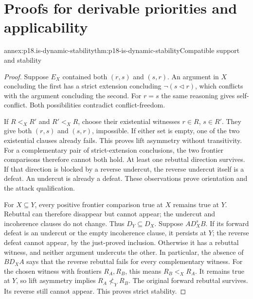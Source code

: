 \chapter{Proofs for derivable priorities and applicability}
\label{annex:p18-is-dynamic}

\begin{annexitem}{annex:p18.is-dynamic-stability}{thm:p18-is-dynamic-stability}{Compatible support and stability}
\begin{proof}
Suppose \(E_X\) contained both \((r,s)\) and \((s,r)\).
An argument in \(X\) concluding the first has a strict extension
concluding \(\neg(s\triangleleft r)\), which conflicts with the
argument concluding the second. For \(r=s\) the same reasoning
gives self-conflict. Both possibilities contradict conflict-freedom.

If \(R<_XR'\) and \(R'<_XR\), choose their existential witnesses
\(r\in R\), \(s\in R'\). They give both \((r,s)\) and \((s,r)\),
impossible. If either set is empty, one of the two existential
clauses already fails. This proves lift asymmetry without
transitivity. For a complementary pair of strict-extension
conclusions, the two frontier comparisons therefore cannot both
hold. At least one rebuttal direction survives. If that direction
is blocked by a reverse undercut, the reverse undercut itself is
a defeat. An undercut is already a defeat. These observations prove
orientation and the attack qualification.

For \(X\subseteq Y\), every positive frontier comparison true at
\(X\) remains true at \(Y\). Rebuttal can therefore disappear but
cannot appear; the undercut and incoherence clauses do not change.
Thus \(D_Y\subseteq D_X\).
Suppose \(A D_X^s B\). If its forward defeat is an undercut or
the empty incoherence clause, it persists at \(Y\); the reverse
defeat cannot appear, by the just-proved inclusion.
Otherwise it has a rebuttal witness, and neither argument undercuts
the other. In particular, the absence of \(B D_XA\) says that
the reverse rebuttal fails for every complementary witness.
For the chosen witness with frontiers \(R_A,R_B\), this means
\(R_B<_XR_A\). It remains true at \(Y\), so lift asymmetry implies
\(R_A\not<_YR_B\). The original forward rebuttal survives.
Its reverse still cannot appear. This proves strict stability.
\end{proof}
\end{annexitem}


